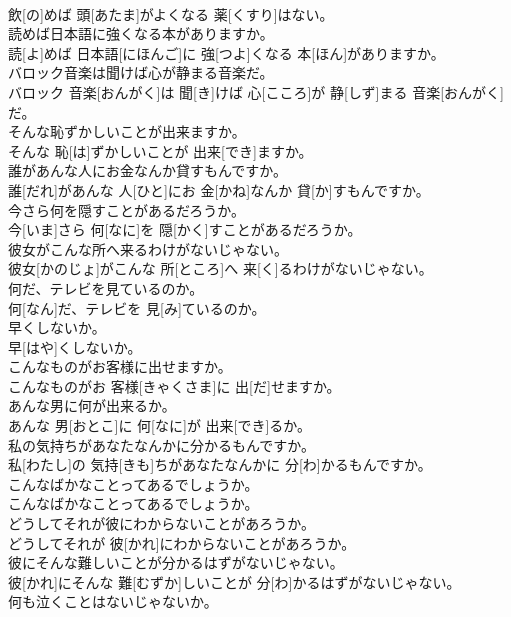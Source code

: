 \documentclass[8pt]{extreport}
\begin{document}
\begin{CJK}{UTF8}{min}
\\	飲[の]めば 頭[あたま]がよくなる 薬[くすり]はない。
\\	読めば日本語に強くなる本がありますか。	
\\	読[よ]めば 日本語[にほんご]に 強[つよ]くなる 本[ほん]がありますか。
\\	バロック音楽は聞けば心が静まる音楽だ。	
\\	バロック 音楽[おんがく]は 聞[き]けば 心[こころ]が 静[しず]まる 音楽[おんがく]だ。
\\	そんな恥ずかしいことが出来ますか。	
\\	そんな 恥[は]ずかしいことが 出来[でき]ますか。
\\	誰があんな人にお金なんか貸すもんですか。	
\\	誰[だれ]があんな 人[ひと]にお 金[かね]なんか 貸[か]すもんですか。
\\	今さら何を隠すことがあるだろうか。	
\\	今[いま]さら 何[なに]を 隠[かく]すことがあるだろうか。
\\	彼女がこんな所へ来るわけがないじゃない。	
\\	彼女[かのじょ]がこんな 所[ところ]へ 来[く]るわけがないじゃない。
\\	何だ、テレビを見ているのか。	
\\	何[なん]だ、テレビを 見[み]ているのか。
\\	早くしないか。	
\\	早[はや]くしないか。
\\	こんなものがお客様に出せますか。	
\\	こんなものがお 客様[きゃくさま]に 出[だ]せますか。
\\	あんな男に何が出来るか。	
\\	あんな 男[おとこ]に 何[なに]が 出来[でき]るか。
\\	私の気持ちがあなたなんかに分かるもんですか。	
\\	私[わたし]の 気持[きも]ちがあなたなんかに 分[わ]かるもんですか。
\\	こんなばかなことってあるでしょうか。	
\\	こんなばかなことってあるでしょうか。
\\	どうしてそれが彼にわからないことがあろうか。	
\\	どうしてそれが 彼[かれ]にわからないことがあろうか。
\\	彼にそんな難しいことが分かるはずがないじゃない。	
\\	彼[かれ]にそんな 難[むずか]しいことが 分[わ]かるはずがないじゃない。
\\	何も泣くことはないじゃないか。	

\end{CJK}
\end{document}
